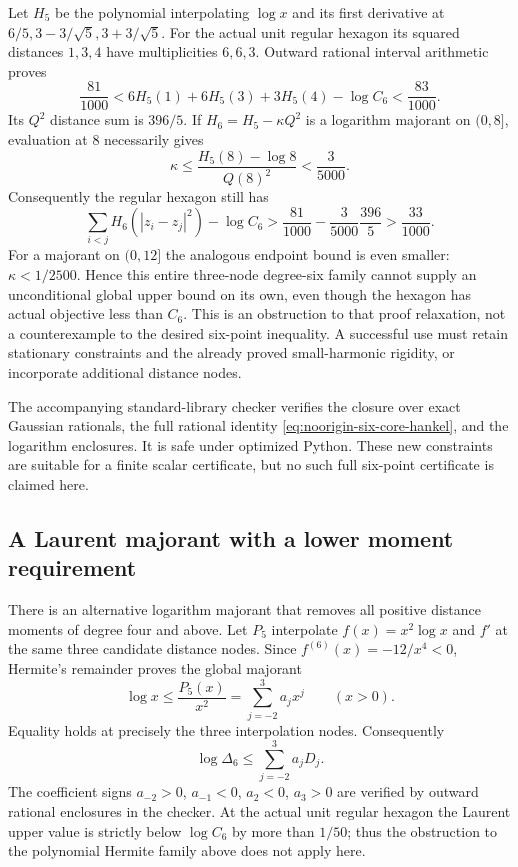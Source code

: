 \documentclass[11pt]{article}
\theoremstyle{remark}
\numberwithin{equation}{section}
\begin{document}
Let $H_5$ be the polynomial interpolating $\log x$ and its first
derivative at $6/5,3-3/\sqrt5,3+3/\sqrt5$. For the actual unit
regular hexagon its squared distances $1,3,4$ have multiplicities
$6,6,3$. Outward rational interval arithmetic proves
\[
 \frac{81}{1000}<6H_5(1)+6H_5(3)+3H_5(4)-\log C_6
                       <\frac{83}{1000}.
\]
Its $Q^2$ distance sum is $396/5$.
If $H_6=H_5-\kappa Q^2$ is a logarithm majorant on $(0,8]$,
evaluation at $8$ necessarily gives
\[
 \kappa\le\frac{H_5(8)-\log8}{Q(8)^2}<\frac3{5000}.
\]
Consequently the regular hexagon still has
\[
                 \sum_{i<j}H_6(|z_i-z_j|^2)-\log C_6
                  >\frac{81}{1000}-\frac3{5000}\frac{396}{5}
                  >\frac{33}{1000}.
\]
For a majorant on $(0,12]$ the analogous endpoint bound is even
smaller: $\kappa<1/2500$. Hence this entire three-node degree-six
family cannot supply an unconditional global upper bound on its own,
even though the hexagon has actual objective less than $C_6$.
This is an obstruction to that proof relaxation, not a counterexample
to the desired six-point inequality. A successful use must retain
stationary constraints and the already proved small-harmonic rigidity,
or incorporate additional distance nodes.

The accompanying standard-library checker verifies the closure over
exact Gaussian rationals, the full rational identity
\eqref{eq:noorigin-six-core-hankel}, and the logarithm enclosures.
It is safe under optimized Python. These new constraints are suitable
for a finite scalar certificate, but no such full six-point certificate
is claimed here.

\subsection{A Laurent majorant with a lower moment requirement}

There is an alternative logarithm majorant that removes all positive
distance moments of degree four and above. Let $P_5$ interpolate
$f(x)=x^2\log x$ and $f'$ at the same three candidate distance nodes.
Since $f^{(6)}(x)=-12/x^4<0$, Hermite's remainder proves the global
majorant
\[
 \log x\le\frac{P_5(x)}{x^2}
        =\sum_{j=-2}^3 a_jx^j\qquad(x>0).
\]
Equality holds at precisely the three interpolation nodes.
Consequently
\[
             \log\Delta_6\le\sum_{j=-2}^3a_jD_j.
\]
The coefficient signs $a_{-2}>0$, $a_{-1}<0$, $a_2<0$, $a_3>0$
are verified by outward rational enclosures in the checker.
At the actual unit regular hexagon the Laurent upper value is
strictly below $\log C_6$ by more than $1/50$; thus the obstruction
to the polynomial Hermite family above does not apply here.
\end{document}

